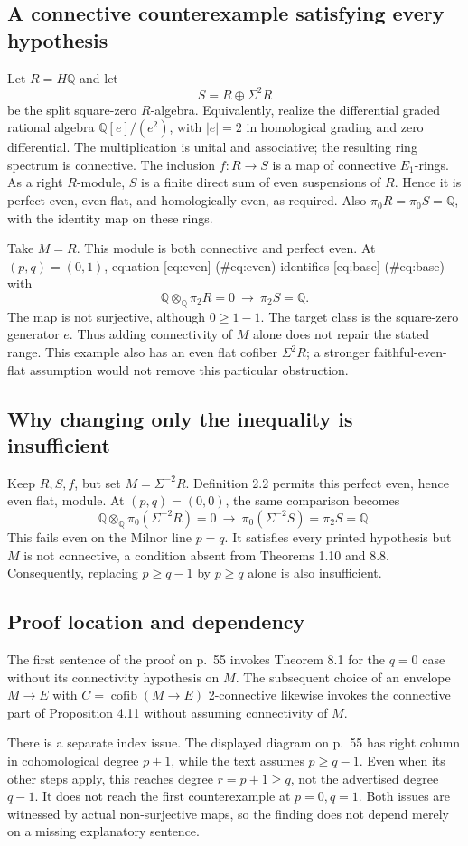 \documentclass[10pt]{article}
\begin{document}
\subsection*{A connective counterexample satisfying every hypothesis}
Let \(R=H\mathbb Q\) and let \[S=R\oplus\Sigma^2R\] be the split square-zero \(R\)-algebra. Equivalently, realize the differential graded rational algebra \(\mathbb Q[e]/(e^2)\), with \(|e|=2\) in homological grading and zero differential. The multiplication is unital and associative; the resulting ring spectrum is connective. The inclusion \(f:R\to S\) is a map of connective \(E_1\)-rings. As a right \(R\)-module, \(S\) is a finite direct sum of even suspensions of \(R\). Hence it is perfect even, even flat, and homologically even, as required. Also \(\pi_0R=\pi_0S=\mathbb Q\), with the identity map on these rings.\par
Take \(M=R\). This module is both connective and perfect even. At \((p,q)=(0,1)\), equation [eq:even] (\#eq:even) identifies [eq:base] (\#eq:base) with \[\mathbb Q\otimes_\mathbb Q\pi_2R=0
 \ \longrightarrow\ \pi_2S=\mathbb Q.\] The map is not surjective, although \(0\ge1-1\). The target class is the square-zero generator \(e\). Thus adding connectivity of \(M\) alone does not repair the stated range. This example also has an even flat cofiber \(\Sigma^2R\); a stronger faithful-even-flat assumption would not remove this particular obstruction.\par
\subsection*{Why changing only the inequality is insufficient}
Keep \(R,S,f\), but set \(M=\Sigma^{-2}R\). Definition 2.2 permits this perfect even, hence even flat, module. At \((p,q)=(0,0)\), the same comparison becomes \[\mathbb Q\otimes_\mathbb Q\pi_0(\Sigma^{-2}R)=0
 \ \longrightarrow\
 \pi_0(\Sigma^{-2}S)=\pi_2S=\mathbb Q.\] This fails even on the Milnor line \(p=q\). It satisfies every printed hypothesis but \(M\) is not connective, a condition absent from Theorems 1.10 and 8.8. Consequently, replacing \(p\ge q-1\) by \(p\ge q\) alone is also insufficient.\par
\subsection*{Proof location and dependency}
The first sentence of the proof on p. 55 invokes Theorem 8.1 for the \(q=0\) case without its connectivity hypothesis on \(M\). The subsequent choice of an envelope \(M\to E\) with \(C=\operatorname{cofib}(M\to E)\) 2-connective likewise invokes the connective part of Proposition 4.11 without assuming connectivity of \(M\).\par
There is a separate index issue. The displayed diagram on p. 55 has right column in cohomological degree \(p+1\), while the text assumes \(p\ge q-1\). Even when its other steps apply, this reaches degree \(r=p+1\ge q\), not the advertised degree \(q-1\). It does not reach the first counterexample at \(p=0,q=1\). Both issues are witnessed by actual non-surjective maps, so the finding does not depend merely on a missing explanatory sentence.\par
\end{document}
